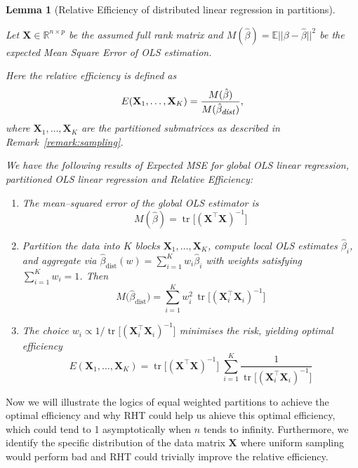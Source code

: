 \documentclass[11pt]{article}
\numberwithin{equation}{section}
\theoremstyle{plain}
\newtheorem{lemma}[theorem]{Lemma}
\theoremstyle{definition}
\theoremstyle{remark}
\begin{document}
\begin{lemma}[Relative Efficiency of distributed linear regression in partitions]
  \label{lem:finiteresults}

    Let \(\mathbf{X}\in\mathbb{R}^{n\times p}\) be the assumed full rank matrix and $M(\hat{\beta}) = \mathbb{E}||\beta - \hat{\beta}||^2$ be the expected Mean Square Error of OLS estimation.
    
    Here the relative efficiency is defined as 
    \[
    E(\mathbf{X}_1,\dots,\mathbf{X}_K) = \frac{M(\hat{\beta})}{M(\hat{\beta}_{\text{\footnotesize \textit{dist}}})},
    \]
    where \({\mathbf{X}}_{1}, \ldots, {\mathbf{X}}_{K}\) are the partitioned submatrices as described in Remark~\ref{remark:sampling}.

    We have the following results of Expected MSE for global OLS linear regression, partitioned OLS linear regression and Relative Efficiency:
    \begin{enumerate}
    \item The mean–squared error of the global OLS estimator is
          \[
            M(\hat\beta)=\operatorname{tr}\!\bigl[(\mathbf{X}^{\top}\mathbf{X})^{-1}\bigr]\tag{2.1} \label{eq:2.1}
          \]
    \item Partition the data into \(K\) blocks \(\mathbf{X}_1,\dots,\mathbf{X}_K\),
          compute local OLS estimates \(\hat\beta_{i}\), and aggregate via
          \(\hat\beta_{\mathrm{dist}}(w)=\sum_{i=1}^{K}w_{i}\hat\beta_{i}\)
          with weights satisfying \(\sum_{i=1}^{K}w_{i}=1\).
          Then
          \[
            M\!\bigl(\hat\beta_{\mathrm{dist}}\bigr)=
            \sum_{i=1}^{K}w_{i}^{2}\,
            \operatorname{tr}\!\bigl[(\mathbf{X}_{i}^{\top}\mathbf{X}_{i})^{-1}\bigr]\tag{2.2} \label{eq:2.2}
          \]
    \item The choice
          \(w_{i}\propto 1/\operatorname{tr}\!\bigl[(\mathbf{X}_{i}^{\top}\mathbf{X}_{i})^{-1}\bigr]\)
          minimises the risk, yielding optimal efficiency
          \[
            E(\mathbf{X}_{1},\dots,\mathbf{X}_{K})=
            \operatorname{tr}\!\bigl[(\mathbf{X}^{\top}\mathbf{X})^{-1}\bigr]\;
            \sum_{i=1}^{K}
            \frac{1}{\operatorname{tr}\!\bigl[(\mathbf{X}_{i}^{\top}\mathbf{X}_{i})^{-1}\bigr]}\tag{2.3} \label{eq:2.3}
          \]
    \end{enumerate}
    \end{lemma}
\vspace{0.39cm}
Now we will illustrate the logics of equal weighted partitions to achieve the optimal efficiency and why RHT could help us ahieve this optimal efficiency, which could tend to 1 asymptotically when $n$ tends to infinity. Furthermore, we identify the specific distribution of the data matrix $\mathbf{X}$ where uniform sampling would perform bad and RHT could trivially improve the relative efficiency.
\end{document}
